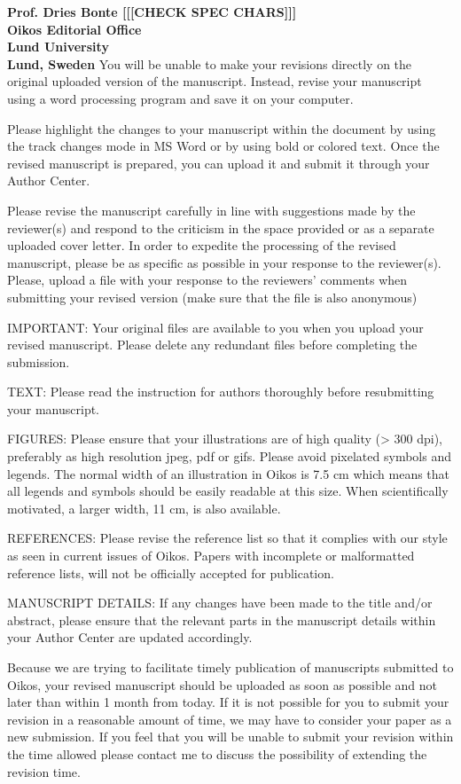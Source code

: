 \documentclass[12pt]{letter}
\begin{document}
\begin{letter}{\bf Prof. Dries Bonte [[[CHECK SPEC CHARS]]]\\
Oikos Editorial Office \\
Lund University \\
Lund, Sweden}
You will be unable to make your revisions directly on the original uploaded version of the manuscript.  Instead, revise your manuscript using a word processing program and save it on your computer.

Please highlight the changes to your manuscript within the document by using the track changes mode in MS Word or by using bold or colored text. Once the revised manuscript is prepared, you can upload it and submit it through your Author Center.

Please revise the manuscript carefully in line with suggestions made by the reviewer(s) and respond to the criticism in the space provided or as a separate uploaded cover letter.  In order to expedite the processing of the revised manuscript, please be as specific as possible in your response to the reviewer(s). Please, upload a file with your response to the reviewers' comments when submitting your revised version (make sure that the file is also anonymous)

IMPORTANT:  Your original files are available to you when you upload your revised manuscript.  Please delete any redundant files before completing the submission.

TEXT: Please read the instruction for authors thoroughly before resubmitting your manuscript.

FIGURES: Please ensure that your illustrations are of high quality (> 300 dpi), preferably as high resolution jpeg, pdf or gifs. Please avoid pixelated symbols and legends. The normal width of an illustration in Oikos is 7.5 cm which means that all legends and symbols should be easily readable at this size. When scientifically motivated, a larger width, 11 cm, is also available.

REFERENCES: Please revise the reference list so that it complies with our style as seen in current issues of Oikos.  Papers with incomplete or malformatted reference lists, will not be officially accepted for publication.

MANUSCRIPT DETAILS: If any changes have been made to the title and/or abstract, please ensure that the relevant parts in the manuscript details within your Author Center are updated accordingly.

Because we are trying to facilitate timely publication of manuscripts submitted to Oikos, your revised manuscript should be uploaded as soon as possible and not later than within 1 month from today.  If it is not possible for you to submit your revision in a reasonable amount of time, we may have to consider your paper as a new submission.  If you feel that you will be unable to submit your revision within the time allowed please contact me to discuss the possibility of extending the revision time.


\end{letter}
\end{document}
